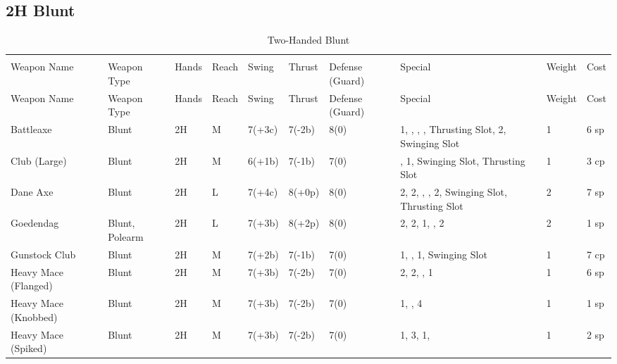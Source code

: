 \documentclass[oneside,11pt,english]{book}
\begin{document}
\subsection{2H Blunt}\vspace{-15pt}
\begin{longtabu} to 1\linewidth {X[2,l]XX[-1,c]X[-1,c]XXX[-1,c]X[2,l]X[-3,c]X[-3,r]}
	\captionsetup{labelformat=blank,textformat=empty}
	\caption{Two-Handed Blunt}\vspace{-15pt}
	\label{tab:2H Blunt}\\
		Weapon Name						&Weapon Type	&Hands&Reach&Swing&Thrust&Defense (Guard)&Special						&Weight	&Cost\\\toprule\endfirsthead
Weapon Name				&Weapon Type	&Hands	&Reach	&Swing&Thrust&Defense (Guard)&Special																	&Weight	&Cost\\\toprule\endhead
Battleaxe				&Blunt			&2H		&M		&7(+3c)&7(-2b)&8(0)& 1, , , , Thrusting Slot,  2, Swinging Slot	&1 &6 sp\\
Club (Large) 			&Blunt			&2H		&M		&6(+1b)&7(-1b)&7(0)&,  1, Swinging Slot, Thrusting Slot								&1 &3 cp\\
Dane Axe 				&Blunt			&2H		&L		&7(+4c)&8(+0p)&8(0)& 2,  2, , ,  2, Swinging Slot, Thrusting Slot	&2 &7 sp\\
Goedendag 				&Blunt, Polearm	&2H		&L		&7(+3b)&8(+2p)&8(0)& 2,  2,  1, ,  2							&2 &1 sp\\
Gunstock Club 			&Blunt			&2H		&M		&7(+2b)&7(-1b)&7(0)& 1, ,  1, Swinging Slot									&1 &7 cp\\
Heavy Mace (Flanged)	&Blunt			&2H		&M		&7(+3b)&7(-2b)&7(0)& 2,  2, ,  1										&1 &6 sp\\
Heavy Mace (Knobbed)	&Blunt			&2H		&M		&7(+3b)&7(-2b)&7(0)& 1, ,  4													&1 &1 sp\\
Heavy Mace (Spiked) 	&Blunt			&2H		&M		&7(+3b)&7(-2b)&7(0)& 1,  3,  1, 										&1 &2 sp\\

\end{longtabu}
\end{document}
